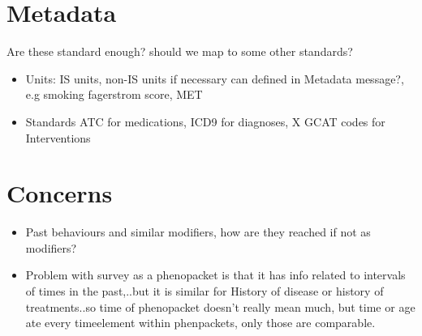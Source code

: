 \documentclass[a4paper, 10pt]{article}
\begin{document}
\section{Metadata}
Are these standard enough? should we map to some other standards?

\begin{itemize}

\item Units: IS units, non-IS units if necessary can defined in Metadata message?, e.g smoking fagerstrom score, MET

\item Standards ATC for medications, ICD9 for diagnoses, X GCAT codes for Interventions 

\end{itemize}


\section{Concerns}
\begin{itemize}

\item Past behaviours and similar modifiers, how are they reached if not as modifiers?

\item Problem with survey as a phenopacket is that it has info related to intervals of times in the past,..but it is similar for History of disease or history of treatments..so time of phenopacket doesn't really mean much, but time or age ate every timeelement within phenpackets, only those are comparable.

\end{itemize}
\end{document}
